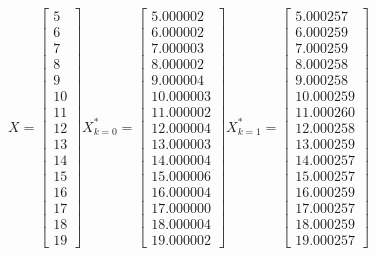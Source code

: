 \documentclass[a4paper, 12pt]{article}
\begin{document}
\[
X = \left[{\begin{array}{r}
	5 \\
	6 \\
	7 \\
	8 \\
	9 \\
	10 \\
	11 \\
	12 \\
	13 \\
	14 \\
	15 \\
	16 \\
	17 \\
	18 \\
	19
	\end{array}}\right]
X^*_{k = 0} = \left[{\begin{array}{r}
	5.000002 \\
	6.000002 \\
	7.000003 \\
	8.000002 \\
	9.000004 \\
	10.000003 \\
	11.000002 \\
	12.000004 \\
	13.000003 \\
	14.000004 \\
	15.000006 \\
	16.000004 \\
	17.000000 \\
	18.000004 \\
	19.000002
	\end{array}}\right]
X^*_{k = 1} = \left[{
	\begin{array}{r}
	5.000257 \\
	6.000259 \\
	7.000259 \\ 
	8.000258 \\
	9.000258 \\
	10.000259 \\
	11.000260 \\
	12.000258 \\ 
	13.000259 \\
	14.000257 \\ 
	15.000257 \\
	16.000259 \\
	17.000257 \\
	18.000259 \\
	19.000257
	\end{array}}\right]
\]
\end{document}
